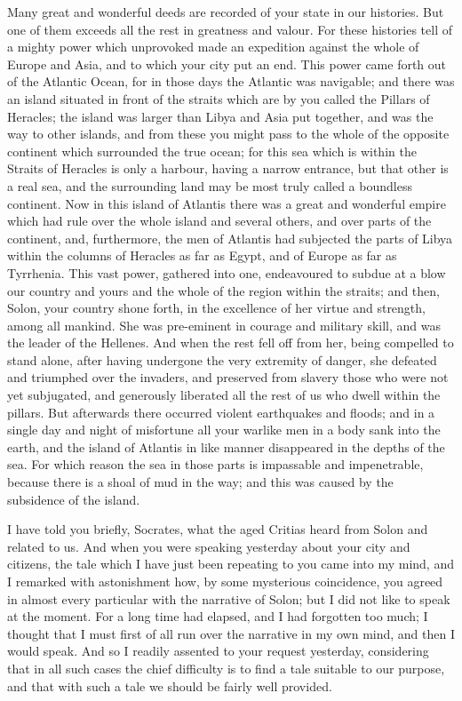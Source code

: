 Many great and wonderful deeds are recorded of your state in our
histories. But one of them exceeds all the rest in greatness and valour.
For these histories tell of a mighty power which unprovoked made an
expedition against the whole of Europe and Asia, and to which your city
put an end. This power came forth out of the Atlantic Ocean, for in those
days the Atlantic was navigable; and there was an island situated in front
of the straits which are by you called the Pillars of Heracles; the island
was larger than Libya and Asia put together, and was the way to other
islands, and from these you might pass to the whole of the opposite
continent which surrounded the true ocean; for this sea which is within
the Straits of Heracles is only a harbour, having a narrow entrance, but
that other is a real sea, and the surrounding land may be most truly
called a boundless continent. Now in this island of Atlantis there was a
great and wonderful empire which had rule over the whole island and
several others, and over parts of the continent, and, furthermore, the men
of Atlantis had subjected the parts of Libya within the columns of
Heracles as far as Egypt, and of Europe as far as Tyrrhenia. This vast
power, gathered into one, endeavoured to subdue at a blow our country and
yours and the whole of the region within the straits; and then, Solon,
your country shone forth, in the excellence of her virtue and strength,
among all mankind. She was pre-eminent in courage and military skill, and
was the leader of the Hellenes. And when the rest fell off from her, being
compelled to stand alone, after having undergone the very extremity of
danger, she defeated and triumphed over the invaders, and preserved from
slavery those who were not yet subjugated, and generously liberated all
the rest of us who dwell within the pillars. But afterwards there occurred
violent earthquakes and floods; and in a single day and night of
misfortune all your warlike men in a body sank into the earth, and the
island of Atlantis in like manner disappeared in the depths of the sea.
For which reason the sea in those parts is impassable and impenetrable,
because there is a shoal of mud in the way; and this was caused by the
subsidence of the island.

I have told you briefly, Socrates, what the aged Critias heard from Solon
and related to us. And when you were speaking yesterday about your city
and citizens, the tale which I have just been repeating to you came into
my mind, and I remarked with astonishment how, by some mysterious
coincidence, you agreed in almost every particular with the narrative of
Solon; but I did not like to speak at the moment. For a long time had
elapsed, and I had forgotten too much; I thought that I must first of all
run over the narrative in my own mind, and then I would speak. And so I
readily assented to your request yesterday, considering that in all such
cases the chief difficulty is to find a tale suitable to our purpose, and
that with such a tale we should be fairly well provided.

